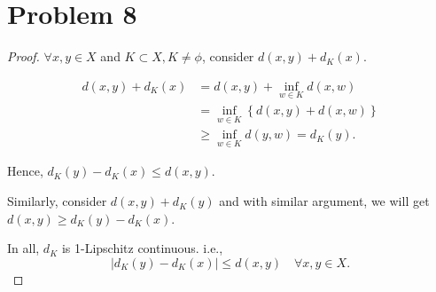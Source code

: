 \documentclass[12pt]{article}
\begin{document}
\section*{Problem 8}

\begin{proof}

$\forall x, y \in X$ and $K \subset X, K \neq \phi$, 
consider $d(x, y) + d_K(x)$.

$$
\begin{aligned}
d(x, y) + d_K(x) & = d(x, y) + \inf_{w \in K} d(x, w) \\
& = \inf_{w \in K} \left\{  d(x, y) + d(x, w) \right\} \\
& \geqslant \inf_{w\in K} d(y, w) = d_K(y).
\end{aligned}
$$

Hence, $d_K(y) - d_K(x) \leqslant d(x, y)$.

Similarly, consider $d(x, y) + d_K(y)$ and with similar argument, we will get $d(x, y) \geqslant d_K(y) - d_K(x)$.

In all, $d_K$ is 1-Lipschitz continuous. i.e., 
$$
|d_K(y) - d_K(x)| \leqslant d(x, y) \quad \forall x, y \in X.
$$

\end{proof}
\end{document}
